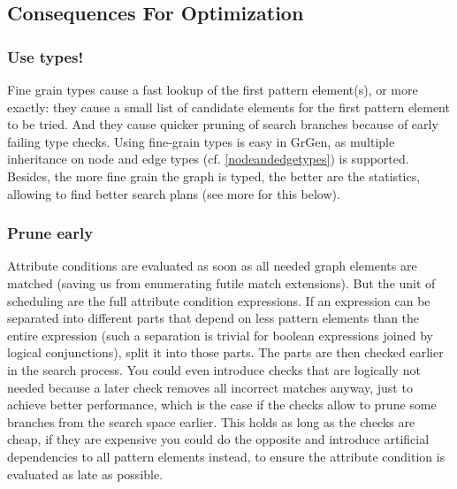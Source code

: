 \pagebreak %

\subsection{Consequences For Optimization}

\subsubsection*{Use types!}
Fine grain types cause a fast lookup of the first pattern element(s), or more exactly: they cause a small list of candidate elements for the first pattern element to be tried.
And they cause quicker pruning of search branches because of early failing type checks.
Using fine-grain types is easy in GrGen, as multiple inheritance on node and edge types (cf. \ref{nodeandedgetypes}) is supported.
Besides, the more fine grain the graph is typed, the better are the statistics, allowing \GrG{ } to find better search plans (see more for this below).

\subsubsection*{Prune early}
Attribute conditions are evaluated as soon as all needed graph elements are matched (saving us from enumerating futile match extensions).
But the unit of scheduling are the full attribute condition expressions. 
If an expression can be separated into different parts that depend on less pattern elements than the entire expression (such a separation is trivial for boolean expressions joined by logical conjunctions), split it into those parts.
The parts are then checked earlier in the search process.
You could even introduce checks that are logically not needed because a later check removes all incorrect matches anyway, just to achieve better performance, which is the case if the checks allow to prune some branches from the search space earlier.
This holds as long as the checks are cheap, if they are expensive you could do the opposite and introduce artificial dependencies to all pattern elements instead, to ensure the attribute condition is evaluated as late as possible.


